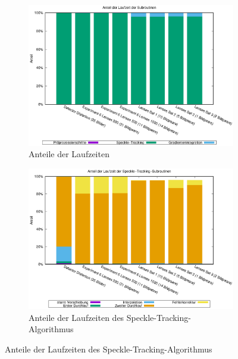 \begin{center}
	\begin{figure}[htbp]
		\begin{subfigure}[b]{0.7\textwidth}
			\centering
			\includegraphics[width=\textwidth]{pdf/main}
			\caption{Anteile der Laufzeiten}
			\label{fig:perc_main}
		\end{subfigure}
		
		\begin{subfigure}[b]{0.7\textwidth}
			\centering
			\includegraphics[width=\textwidth]{pdf/speckle}
			\caption{Anteile der Laufzeiten des Speckle-Tracking-Algorithmus}
			\label{fig:perc_speckle}
		\end{subfigure}
		

\end{figure}
\end{center}

